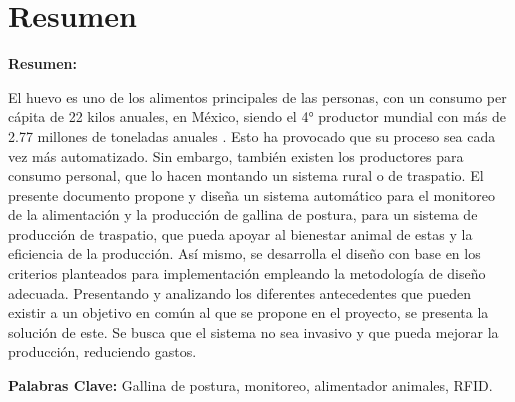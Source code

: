 \chapter{Resumen}


\textbf{Resumen:} 

El huevo es uno de los alimentos principales de las personas, con un consumo per cápita de 22 kilos anuales, en México, siendo el 4° productor mundial con más de 2.77 millones de toneladas anuales \cite{AGRICULTURA}. Esto ha provocado que su proceso sea cada vez más automatizado. Sin embargo, también existen los productores para consumo personal, que lo hacen montando un sistema rural o de traspatio. El presente documento propone y diseña un sistema automático para el monitoreo de la alimentación y la producción de gallina de postura, para un sistema de producción de traspatio, que pueda apoyar al bienestar animal de estas y la eficiencia de la producción. Así mismo, se desarrolla el diseño con base en los criterios planteados para implementación empleando la metodología de diseño adecuada. Presentando y analizando los diferentes antecedentes que pueden existir a un objetivo en común al que se propone en el proyecto, se presenta la solución de este. Se busca que el sistema no sea invasivo y que pueda mejorar la producción, reduciendo gastos.



\textbf{Palabras Clave:} Gallina de postura, monitoreo, alimentador animales, RFID.




\endinput 
